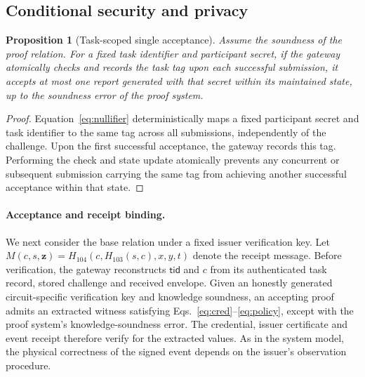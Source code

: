 \documentclass[pdflatex,iicol,sn-mathphys-num]{sn-jnl}
\newtheorem{proposition}{Proposition}
\begin{document}
\subsection{Conditional security and privacy}
\label{sec:interpretation}

\begin{proposition}[Task-scoped single acceptance]
Assume the soundness of the proof relation. For a fixed task identifier and participant secret, if the gateway atomically checks and records the task tag upon each successful submission, it accepts at most one report generated with that secret within its maintained state, up to the soundness error of the proof system.
\end{proposition}
\begin{proof}
Equation~\eqref{eq:nullifier} deterministically maps a fixed participant secret and task identifier to the same tag across all submissions, independently of the challenge. Upon the first successful acceptance, the gateway records this tag. Performing the check and state update atomically prevents any concurrent or subsequent submission carrying the same tag from achieving another successful acceptance within that state.
\end{proof}


\paragraph{Acceptance and receipt binding.} We next consider the base relation under a fixed issuer verification key. Let $M(c,s,\boldsymbol z)=H_{104}(c,H_{103}(s,c),x,y,t)$ denote the receipt message. Before verification, the gateway reconstructs $\mathsf{tid}$ and $c$ from its authenticated task record, stored challenge and received envelope. Given an honestly generated circuit-specific verification key and knowledge soundness, an accepting proof admits an extracted witness satisfying Eqs.~\eqref{eq:cred}--\eqref{eq:policy}, except with the proof system's knowledge-soundness error. The credential, issuer certificate and event receipt therefore verify for the extracted values. As in the system model, the physical correctness of the signed event depends on the issuer's observation procedure.
\end{document}
